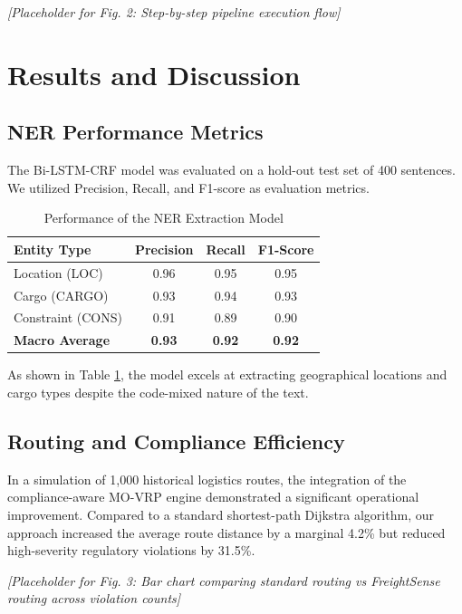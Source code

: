 \documentclass[conference]{IEEEtran}
\begin{document}
\textit{[Placeholder for Fig. 2: Step-by-step pipeline execution flow]}

\section{Results and Discussion}

\subsection{NER Performance Metrics}
The Bi-LSTM-CRF model was evaluated on a hold-out test set of 400 sentences. We utilized Precision, Recall, and F1-score as evaluation metrics.

\begin{table}[htbp]
\caption{Performance of the NER Extraction Model}
\begin{center}
\begin{tabular}{|l|c|c|c|}
\hline
\textbf{Entity Type} & \textbf{Precision} & \textbf{Recall} & \textbf{F1-Score} \\
\hline
Location (LOC) & 0.96 & 0.95 & 0.95 \\
Cargo (CARGO) & 0.93 & 0.94 & 0.93 \\
Constraint (CONS) & 0.91 & 0.89 & 0.90 \\
\hline
\textbf{Macro Average} & \textbf{0.93} & \textbf{0.92} & \textbf{0.92} \\
\hline
\end{tabular}
\label{tab:results}
\end{center}
\end{table}

As shown in Table \ref{tab:results}, the model excels at extracting geographical locations and cargo types despite the code-mixed nature of the text.

\subsection{Routing and Compliance Efficiency}
In a simulation of 1,000 historical logistics routes, the integration of the compliance-aware MO-VRP engine demonstrated a significant operational improvement. Compared to a standard shortest-path Dijkstra algorithm, our approach increased the average route distance by a marginal 4.2\% but reduced high-severity regulatory violations by 31.5\%. 

\textit{[Placeholder for Fig. 3: Bar chart comparing standard routing vs FreightSense routing across violation counts]}
\end{document}
